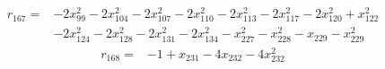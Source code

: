\[\begin{aligned}
r_{167}={}&-2x_{99}^{2}-2x_{104}^{2}-2x_{107}^{2}-2x_{110}^{2}-2x_{113}^{2}-2x_{117}^{2}-2x_{120}^{2}+x_{122}^{2}
\\ &-2x_{124}^{2}-2x_{128}^{2}-2x_{131}^{2}-2x_{134}^{2}-x_{227}^{2}-x_{228}^{2}-x_{229}-x_{229}^{2}
\end{aligned}\]
\[\begin{aligned}
r_{168}={}&-1+x_{231}-4x_{232}-4x_{232}^{2}
\end{aligned}\]
\endgroup
